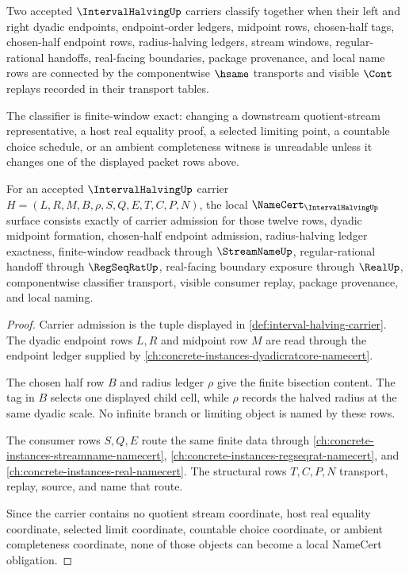 \begin{definition}
\label{def:interval-halving-classifier}
Two accepted $\IntervalHalvingUp$ carriers classify together when their left and right dyadic endpoints, endpoint-order ledgers, midpoint rows, chosen-half tags, chosen-half endpoint rows, radius-halving ledgers, stream windows, regular-rational handoffs, real-facing boundaries, package provenance, and local name rows are connected by the componentwise $\hsame$ transports and visible $\Cont$ replays recorded in their transport tables.

The classifier is finite-window exact: changing a downstream quotient-stream representative, a host real equality proof, a selected limiting point, a countable choice schedule, or an ambient completeness witness is unreadable unless it changes one of the displayed packet rows above.
\end{definition}

\begin{theorem}
\label{thm:interval-halving-namecert-obligations}
For an accepted $\IntervalHalvingUp$ carrier $H=(L,R,M,B,\rho,S,Q,E,T,C,P,N)$, the local $\NameCert_{\IntervalHalvingUp}$ surface consists exactly of carrier admission for those twelve rows, dyadic midpoint formation, chosen-half endpoint admission, radius-halving ledger exactness, finite-window readback through $\StreamNameUp$, regular-rational handoff through $\RegSeqRatUp$, real-facing boundary exposure through $\RealUp$, componentwise classifier transport, visible consumer replay, package provenance, and local naming.
\end{theorem}
\begin{proof}
Carrier admission is the tuple displayed in \autoref{def:interval-halving-carrier}. The dyadic endpoint rows $L,R$ and midpoint row $M$ are read through the endpoint ledger supplied by \autoref{ch:concrete-instances-dyadicratcore-namecert}.

The chosen half row $B$ and radius ledger $\rho$ give the finite bisection content. The tag in $B$ selects one displayed child cell, while $\rho$ records the halved radius at the same dyadic scale. No infinite branch or limiting object is named by these rows.

The consumer rows $S,Q,E$ route the same finite data through \autoref{ch:concrete-instances-streamname-namecert}, \autoref{ch:concrete-instances-regseqrat-namecert}, and \autoref{ch:concrete-instances-real-namecert}. The structural rows $T,C,P,N$ transport, replay, source, and name that route.

Since the carrier contains no quotient stream coordinate, host real equality coordinate, selected limit coordinate, countable choice coordinate, or ambient completeness coordinate, none of those objects can become a local NameCert obligation.
\end{proof}

